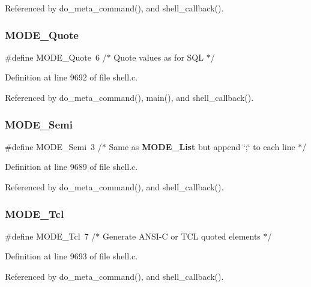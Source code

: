 Referenced by do\+\_\+meta\+\_\+command(), and shell\+\_\+callback().

\mbox{\label{shell_8c_a0c1e1fe64eb39e35eeff7605fbb7ce52}} 
\subsubsection{M\+O\+D\+E\+\_\+\+Quote}
{\footnotesize\ttfamily \#define M\+O\+D\+E\+\_\+\+Quote~6  /$\ast$ Quote values as for S\+QL $\ast$/}



Definition at line 9692 of file shell.\+c.



Referenced by do\+\_\+meta\+\_\+command(), main(), and shell\+\_\+callback().

\mbox{\label{shell_8c_aedee758a7111dcfc0df31798aa596f00}} 
\subsubsection{M\+O\+D\+E\+\_\+\+Semi}
{\footnotesize\ttfamily \#define M\+O\+D\+E\+\_\+\+Semi~3  /$\ast$ Same as \textbf{ M\+O\+D\+E\+\_\+\+List} but append \char`\"{};\char`\"{} to each line $\ast$/}



Definition at line 9689 of file shell.\+c.



Referenced by do\+\_\+meta\+\_\+command(), and shell\+\_\+callback().

\mbox{\label{shell_8c_ac9de07a61fbe0481195d8c27e46750e0}} 
\subsubsection{M\+O\+D\+E\+\_\+\+Tcl}
{\footnotesize\ttfamily \#define M\+O\+D\+E\+\_\+\+Tcl~7  /$\ast$ Generate A\+N\+SI-\/C or T\+CL quoted elements $\ast$/}



Definition at line 9693 of file shell.\+c.



Referenced by do\+\_\+meta\+\_\+command(), and shell\+\_\+callback().

